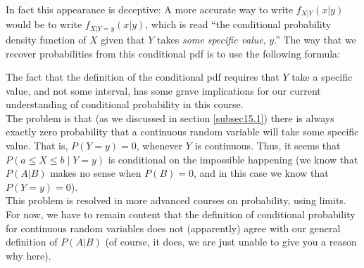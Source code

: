   	\bigskip
	
	\hfil{}
	\bigskip
	\bigskip
	
\noindent In fact this appearance is deceptive: A more accurate way to write $f_{X|Y}(x|y)$ would be to write $f_{X|Y=y}(x|y)$, which is read ``the conditional probability density function of $X$ given that $Y$ takes \textit{some specific value}, $y$.'' The way that we recover probabilities from this conditional pdf is to use the following formula:
  
  	\bigskip
	
	\hfil{}
	\bigskip
	\bigskip

\noindent The fact that the definition of the conditional pdf requires that $Y$ take a specific value, and not some interval, has some grave implications for our current understanding of conditional probability in this course. \\

\noindent The problem is that (as we discussed in section \ref{subsec15.1}) there is always exactly zero probability that a continuous random variable will take some specific value. That is, $P(Y = y) = 0$, whenever $Y$ is continuous. Thus, it seems that $P(a \leq X \leq b \mid Y = y)$ is conditional on the impossible happening (we know that $P(A|B)$ makes no sense when $P(B) = 0$, and in this case we know that $P(Y = y) = 0$). \\

\noindent This problem is resolved in more advanced courses on probability, using limits. For now, we have to remain content that the definition of conditional probability for continuous random variables does not (apparently) agree with our general definition of $P(A|B)$ (of course, it does, we are just unable to give you a reason why here).

